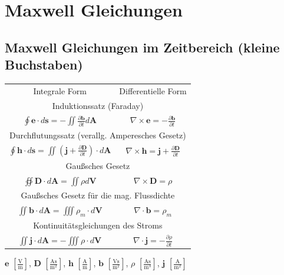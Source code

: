 \documentclass[english]{latex4ei/latex4ei_sheet}
\begin{document}
\section{Maxwell Gleichungen}
\begin{sectionbox}
    \subsection{Maxwell Gleichungen im Zeitbereich (kleine Buchstaben)}
    \begin{tabular*}{\columnwidth}{c | c}
        Integrale Form & Differentielle Form \\

        \multicolumn{2}{c}{Induktionssatz (Faraday)} \\
        \hline
        $\oint \mathbf{e} \cdot d\mathbf{s} = -\iint \frac{\partial\mathbf{b}}{\partial t} d\mathbf{A}$ &  $\nabla \times \mathbf{e} = - \frac{\partial \mathbf{b}}{\partial t}$\\
        \hline
        \multicolumn{2}{c}{Durchflutungssatz (verallg. Amperesches Gesetz)} \\
        \hline
        $\oint \mathbf{h} \cdot d\mathbf{s} = \iint (\mathbf{j} + \frac{\partial \mathbf{D}}{\partial t}) \cdot d\mathbf{A}$ & $\nabla \times \mathbf{h} = \mathbf{j} + \frac{\partial \mathbf{D}}{\partial t}$ \\
        \hline
        \multicolumn{2}{c}{Gaußsches Gesetz} \\
        \hline
        $\oiint \mathbf{D} \cdot d\mathbf{A} = \iint \rho d\mathbf{V}$ & $\nabla \times \mathbf{D} = \rho$\\
        \hline
        \multicolumn{2}{c}{Gaußsches Gesetz für die mag. Flussdichte} \\
        \hline
        $\iint \mathbf{b} \cdot d\mathbf{A} = \iiint \rho_m \cdot d\mathbf{V}$ & $\nabla \cdot \mathbf{b} = \rho_m$ \\
        \hline
        \multicolumn{2}{c}{Kontinuitätsgleichungen des Stroms} \\
        \hline
        $\iint \mathbf{j} \cdot d\mathbf{A} = -\iiint \rho \cdot d\mathbf{V}$ & $\nabla \cdot \mathbf{j} = - \frac{\partial \rho}{\partial t}$\\
    \end{tabular*}

    $\mathbf{e}$ $\left[ \frac{\text{V}}{\text{m}} \right]$,  $\mathbf{D}$ $\left[ \frac{\text{As}}{\text{m}^2} \right]$, $\mathbf{h}$ $\left[ \frac{\text{A}}{\text{m}} \right]$, $\mathbf{b}$ $\left[ \frac{\text{Vs}}{\text{m}^2} \right]$, $\rho$ $\left[ \frac{\text{As}}{\text{m}^3} \right]$, $\mathbf{j}$ $\left[ \frac{\text{A}}{\text{m}^2} \right]$
\end{sectionbox}
\end{document}

